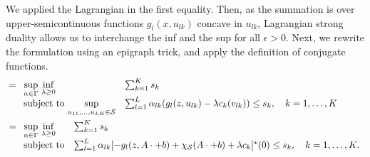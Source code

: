 We applied the Lagrangian in the first equality. Then, as the summation is over upper-semicontinuous functions $g_l(x,u_{lk})$ concave in $u_{lk}$, Lagrangian strong duality allows us to interchange the inf and the sup for all $\epsilon > 0$. Next, we rewrite the formulation using an epigraph trick, and apply the definition of conjugate functions.
\begin{equation*}
	\begin{aligned}
&= \begin{array}[t]{ll}
	\underset{\alpha \in \Gamma}{\sup}~\underset{\lambda \geq 0}{\inf} &\sum_{k=1}^K s_k  \\
	\mbox{subject to}~\underset{u_{11}, \dots, u_{LK} \in \mathcal{S}}{\sup}& \sum_{l=1}^L \alpha_{lk}(g_l(z,u_{lk}) - \lambda c_k(v_{lk})) \le s_k, \quad k = 1,\dots,K
\end{array}\\
&= \begin{array}[t]{ll}
	\underset{\alpha \in \Gamma}{\sup}~\underset{\lambda \geq 0}{\inf} &\sum_{k=1}^K s_k  \\
	\mbox{subject to}& \sum_{l=1}^L \alpha_{lk}[-g_l(z, A\cdot + b) +\chi_{\mathcal{S}}(A\cdot + b) + \lambda c_k]^\star(0) \le s_k, \quad k = 1,\dots,K.
\end{array}\\
\end{aligned}
\end{equation*}
